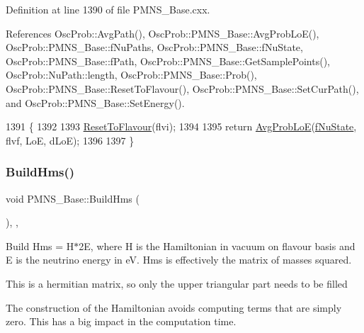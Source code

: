 Definition at line 1390 of file P\+M\+N\+S\+\_\+\+Base.\+cxx.



References Osc\+Prob\+::\+Avg\+Path(), Osc\+Prob\+::\+P\+M\+N\+S\+\_\+\+Base\+::\+Avg\+Prob\+Lo\+E(), Osc\+Prob\+::\+P\+M\+N\+S\+\_\+\+Base\+::f\+Nu\+Paths, Osc\+Prob\+::\+P\+M\+N\+S\+\_\+\+Base\+::f\+Nu\+State, Osc\+Prob\+::\+P\+M\+N\+S\+\_\+\+Base\+::f\+Path, Osc\+Prob\+::\+P\+M\+N\+S\+\_\+\+Base\+::\+Get\+Sample\+Points(), Osc\+Prob\+::\+Nu\+Path\+::length, Osc\+Prob\+::\+P\+M\+N\+S\+\_\+\+Base\+::\+Prob(), Osc\+Prob\+::\+P\+M\+N\+S\+\_\+\+Base\+::\+Reset\+To\+Flavour(), Osc\+Prob\+::\+P\+M\+N\+S\+\_\+\+Base\+::\+Set\+Cur\+Path(), and Osc\+Prob\+::\+P\+M\+N\+S\+\_\+\+Base\+::\+Set\+Energy().


\begin{DoxyCode}
1391 \{
1392 
1393   \hyperlink{classOscProb_1_1PMNS__Base_ac0d4bf8ff1318ef96d3dafa62e0cec25}{ResetToFlavour}(flvi);
1394 
1395   \textcolor{keywordflow}{return} \hyperlink{classOscProb_1_1PMNS__Base_a30d0b056f592acba53cf9ed07430800c}{AvgProbLoE}(\hyperlink{classOscProb_1_1PMNS__Base_abf99f2339e3ee989600740b5d88063e8}{fNuState}, flvf, LoE, dLoE);
1396 
1397 \}
\end{DoxyCode}
\mbox{\label{classOscProb_1_1PMNS__Base_ad0faf5eae755afb1baa1fcd5ffebad41}} 
\subsubsection{\texorpdfstring{Build\+Hms()}{BuildHms()}}
{\footnotesize\ttfamily void P\+M\+N\+S\+\_\+\+Base\+::\+Build\+Hms (\begin{DoxyParamCaption}{ }\end{DoxyParamCaption})\hspace{0.3cm}{\ttfamily [protected]}, {\ttfamily [virtual]}, {\ttfamily [inherited]}}

Build Hms = H$\ast$2E, where H is the Hamiltonian in vacuum on flavour basis and E is the neutrino energy in eV. Hms is effectively the matrix of masses squared.

This is a hermitian matrix, so only the upper triangular part needs to be filled

The construction of the Hamiltonian avoids computing terms that are simply zero. This has a big impact in the computation time. 

